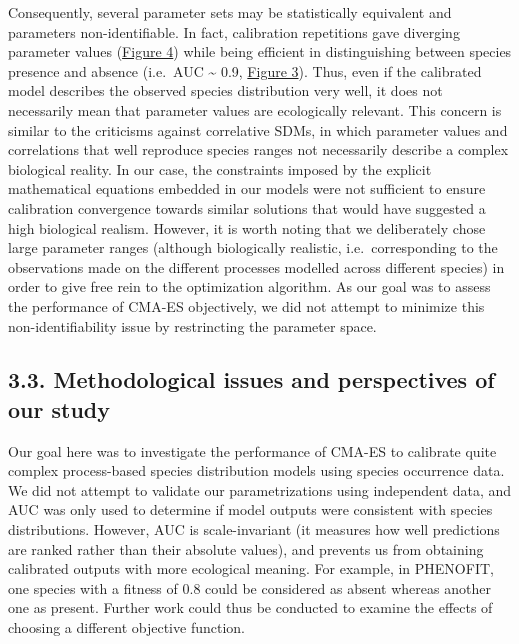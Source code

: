 \documentclass[11pt,]{article}
\begin{document}
Consequently, several parameter sets may be statistically equivalent and
parameters non-identifiable. In fact, calibration repetitions gave
diverging parameter values (\hyperref[fig:unfoldingplots]{Figure 4})
while being efficient in distinguishing between species presence and
absence (i.e.~AUC \textasciitilde{} 0.9,
\hyperref[fig:cmaesrepAUCcal]{Figure 3}). Thus, even if the calibrated
model describes the observed species distribution very well, it does not
necessarily mean that parameter values are ecologically relevant. This
concern is similar to the criticisms against correlative SDMs, in which
parameter values and correlations that well reproduce species ranges not
necessarily describe a complex biological reality. In our case, the
constraints imposed by the explicit mathematical equations embedded in
our models were not sufficient to ensure calibration convergence towards
similar solutions that would have suggested a high biological realism.
However, it is worth noting that we deliberately chose large parameter
ranges (although biologically realistic, i.e.~corresponding to the
observations made on the different processes modelled across different
species) in order to give free rein to the optimization algorithm. As
our goal was to assess the performance of CMA-ES objectively, we did not
attempt to minimize this non-identifiability issue by restrincting the
parameter space.

\hypertarget{methodological-issues-and-perspectives-of-our-study}{%
\subsection{3.3. Methodological issues and perspectives of our
study}\label{methodological-issues-and-perspectives-of-our-study}}

Our goal here was to investigate the performance of CMA-ES to calibrate
quite complex process-based species distribution models using species
occurrence data. We did not attempt to validate our parametrizations
using independent data, and AUC was only used to determine if model
outputs were consistent with species distributions. However, AUC is
scale-invariant (it measures how well predictions are ranked rather than
their absolute values), and prevents us from obtaining calibrated
outputs with more ecological meaning. For example, in PHENOFIT, one
species with a fitness of \(0.8\) could be considered as absent whereas
another one as present. Further work could thus be conducted to examine
the effects of choosing a different objective function.
\end{document}
